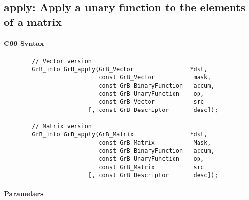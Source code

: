 \subsection{{\sf apply}: Apply a unary function to the elements of a matrix}


\paragraph{C99 Syntax}

\begin{verbatim}
        // Vector version
        GrB_info GrB_apply(GrB_Vector                *dst,
                           const GrB_Vector           mask,
                           const GrB_BinaryFunction   accum,
                           const GrB_UnaryFunction    op,
                           const GrB_Vector           src
                        [, const GrB_Descriptor       desc]);

        // Matrix version
        GrB_info GrB_apply(GrB_Matrix                *dst,
                           const GrB_Matrix           Mask,
                           const GrB_BinaryFunction   accum,
                           const GrB_UnaryFunction    op,
                           const GrB_Matrix           src
                        [, const GrB_Descriptor       desc]);
\end{verbatim}

\paragraph{Parameters}

